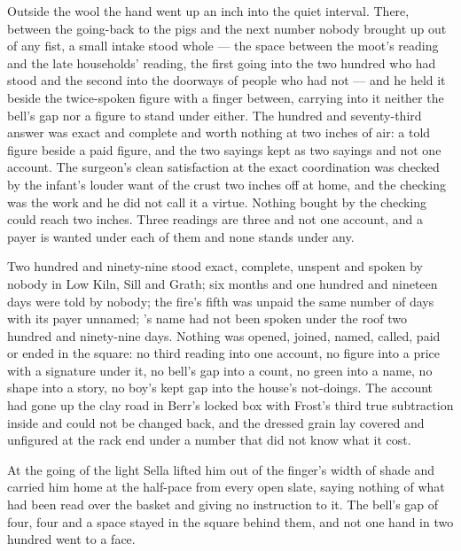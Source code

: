 Outside the wool the hand went up an inch into the quiet interval. There, between the going-back to the pigs and the next number nobody brought up out of any fist, a small intake stood whole --- the space between the moot's reading and the late households' reading, the first going into the two hundred who had stood and the second into the doorways of people who had not --- and he held it beside the twice-spoken figure with a finger between, carrying into it neither the bell's gap nor a figure to stand under either. The hundred and seventy-third answer was exact and complete and worth nothing at two inches of air: a told figure beside a paid figure, and the two sayings kept as two sayings and not one account. The surgeon's clean satisfaction at the exact coordination was checked by the infant's louder want of the crust two inches off at home, and the checking was the work and he did not call it a virtue. Nothing bought by the checking could reach two inches. Three readings are three and not one account, and a payer is wanted under each of them and none stands under any.

Two hundred and ninety-nine stood exact, complete, unspent and spoken by nobody in Low Kiln, Sill and Grath; six months and one hundred and nineteen days were told by nobody; the fire's fifth was unpaid the same number of days with its payer unnamed; 's name had not been spoken under the roof two hundred and ninety-nine days. Nothing was opened, joined, named, called, paid or ended in the square: no third reading into one account, no figure into a price with a signature under it, no bell's gap into a count, no green into a name, no shape into a story, no boy's kept gap into the house's not-doings. The account had gone up the clay road in Berr's locked box with Frost's third true subtraction inside and could not be changed back, and the dressed grain lay covered and unfigured at the rack end under a number that did not know what it cost.

At the going of the light Sella lifted him out of the finger's width of shade and carried him home at the half-pace from every open slate, saying nothing of what had been read over the basket and giving no instruction to it. The bell's gap of four, four and a space stayed in the square behind them, and not one hand in two hundred went to a face.
